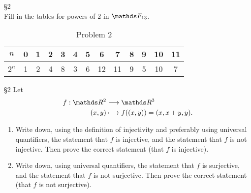 \documentclass{homework}
\begin{document}
\begin{problem}{\S 2}\\
  Fill in the tables for powers of $2$ in $\F_{13}$.
\end{problem}

\begin{solution}
  \begin{table}[htpb]
    \centering
    \caption{Problem 2}
    \begin{tabular}{c||c|c|c|c|c|c|c|c|c|c|c|c}
          $n$ & 0 & 1 & 2 & 3 & 4 & 5 & 6 & 7 & 8 & 9 & 10 & 11 \\
      \toprule \bottomrule
          $2^{n}$ & 1 & 2 & 4 & 8 & 3 & 6 & 12 & 11 & 9 & 5 & 10 & 7
    \end{tabular}
  \end{table}
\end{solution}

\begin{problem}{\S 2}
  Let \begin{align*}
    f: \R^2 &\longrightarrow \R^3 \\
    (x,y) &\longmapsto f((x,y)) = (x,x+y,y)
  .\end{align*}
  \begin{enumerate}[label=(\alph*)]
    \item Write down, using the definition of injectivity and preferably using universal
      quantifiers, the statement that $f$ is injective, and the statement that $f$ is not injective.
      Then prove the correct statement (that $f$ is injective).
    \item Write down, using universal quantifiers, the statement that $f$ is surjective, and the
      statement that $f$ is not surjective. Then prove the correct statement (that $f$ is not
      surjective).
  \end{enumerate}
\end{problem}
\end{document}
